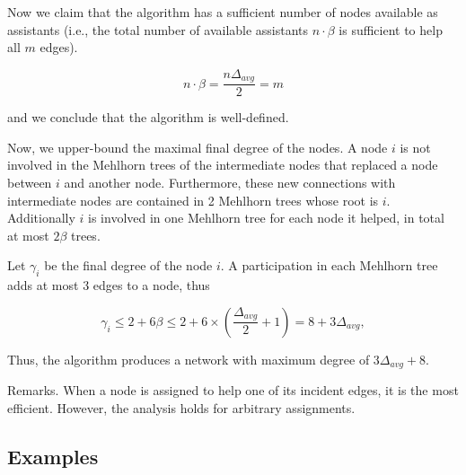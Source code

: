 \documentclass{article}
\begin{document}
\medskip

Now we claim that the algorithm has a sufficient number of nodes available as assistants
 (i.e., the total number of available assistants $n \cdot \beta$ is sufficient to help all $m$ edges).

  $$n \cdot \beta = \frac{n\Delta_{avg}}{2} = m$$

and we conclude that the algorithm is well-defined.

\medskip

Now, we upper-bound the maximal final degree of the nodes.
A node $i$ is not involved in the Mehlhorn trees of the intermediate nodes
that replaced a node between $i$ and another node.
Furthermore, these new connections with intermediate nodes are contained in 2 Mehlhorn trees
whose root is $i$. Additionally $i$ is involved in one Mehlhorn tree
for each node it helped, in total at most $2\beta$ trees.

Let $\gamma_i$ be the final degree of the node $i$.
A participation in each Mehlhorn tree adds at most $3$ edges to a node, thus

$$\gamma_i \leq 2 + 6\beta \leq 2 + 6 \times \left(\frac{\Delta_{avg}}{2}+1\right) = 8 + 3\Delta_{avg},$$

Thus, the algorithm produces a network
with maximum degree of $3\Delta_{avg} + 8$.

Remarks.
When a node is assigned to help one of its incident edges, it is the most efficient.
However, the analysis holds for arbitrary assignments.

\subsection{Examples}
\end{document}
